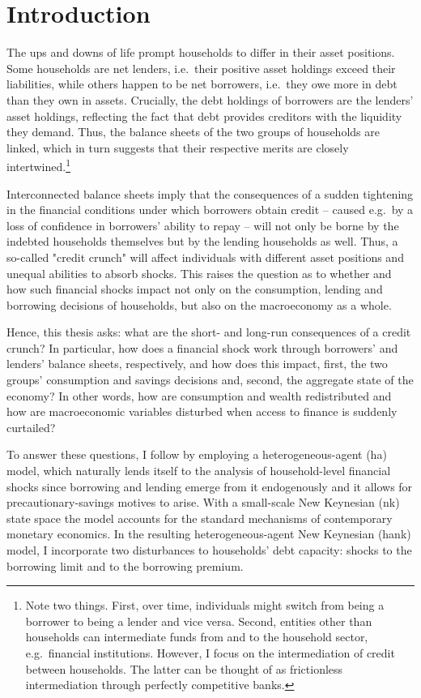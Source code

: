 \documentclass[a4paper,12pt]{article} %
\numberwithin{equation}{section} %
\numberwithin{figure}{section}
\numberwithin{table}{section}
\begin{document}
\section{Introduction}
\label{sec:introduction}

The ups and downs of life prompt households to differ in their asset positions. Some households are net lenders, i.e.~their positive asset holdings exceed their liabilities, while others happen to be net borrowers, i.e.~they owe more in debt than they own in assets. Crucially, the debt holdings of borrowers are the lenders' asset holdings, reflecting the fact that debt provides creditors with the liquidity they demand. Thus, the balance sheets of the two groups of households are linked, which in turn suggests that their respective merits are closely intertwined.\footnote{Note two things. First, over time, individuals might switch from being a borrower to being a lender and vice versa. Second, entities other than households can intermediate funds from and to the household sector, e.g.~financial institutions. However, I focus on the intermediation of credit between households. The latter can be thought of as frictionless intermediation through perfectly competitive banks.}

Interconnected balance sheets imply that the consequences of a sudden tightening in the financial conditions under which borrowers obtain credit -- caused e.g.~by a loss of confidence in borrowers' ability to repay -- will not only be borne by the indebted households themselves but by the lending households as well. Thus, a so-called "credit crunch" will affect individuals with different asset positions and unequal abilities to absorb shocks. This raises the question as to whether and how such financial shocks impact not only on the consumption, lending and borrowing decisions of households, but also on the macroeconomy as a whole. 

Hence, this thesis asks: what are the short- and long-run consequences of a credit crunch? In particular, how does a financial shock work through borrowers' and lenders' balance sheets, respectively, and how does this impact, first, the two groups' consumption and savings decisions and, second, the aggregate state of the economy? In other words, how are consumption and wealth redistributed and how are macroeconomic variables disturbed when access to finance is suddenly curtailed?

To answer these questions, I follow \textcite{gl2017} by employing a heterogeneous-agent (\Gls{ha}) model, which naturally lends itself to the analysis of household-level financial shocks since borrowing and lending emerge from it endogenously and it allows for precautionary-savings motives to arise. With a small-scale New Keynesian (\Gls{nk}) state space the model accounts for the standard mechanisms of contemporary monetary economics. In the resulting heterogeneous-agent New Keynesian (\Gls{hank}) model, I incorporate two disturbances to households' debt capacity: shocks to the borrowing limit and to the borrowing premium.
\end{document}
